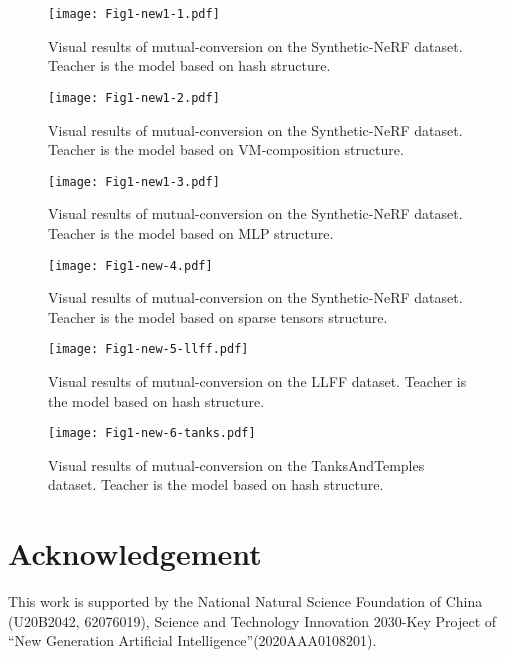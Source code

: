 \documentclass[letterpaper]{article} \usepackage{aaai23}  \usepackage{times}  \usepackage{helvet}  \usepackage{courier}  \usepackage[hyphens]{url}  \usepackage{graphicx} \urlstyle{rm} \def\UrlFont{\rm}  \usepackage{natbib}  \usepackage{caption} \frenchspacing  \setlength{\pdfpagewidth}{8.5in}  \setlength{\pdfpageheight}{11in}  \usepackage{multirow}
\begin{document}
\begin{figure*}[t]
    \centering
    \texttt{[image: Fig1-new1-1.pdf]} \caption{Visual results of mutual-conversion on the Synthetic-NeRF dataset. Teacher is the model based on hash structure.}
    \label{fig-tea-hash-mutual-syn}
\end{figure*}

\begin{figure*}[t]
    \centering
    \texttt{[image: Fig1-new1-2.pdf]} \caption{Visual results of mutual-conversion on the Synthetic-NeRF dataset. Teacher is the model based on VM-composition structure.}
    \label{fig-tea-vm-mutual-syn}
\end{figure*}


\begin{figure*}[t]
    \centering
    \texttt{[image: Fig1-new1-3.pdf]} \caption{Visual results of mutual-conversion on the Synthetic-NeRF dataset. Teacher is the model based on MLP structure.}
    \label{fig-tea-mlp-mutual-syn}
\end{figure*}

\begin{figure*}[t]
    \centering
    \texttt{[image: Fig1-new-4.pdf]} \caption{Visual results of mutual-conversion on the Synthetic-NeRF dataset. Teacher is the model based on sparse tensors structure.}
    \label{fig-tea-tensor-mutual-syn}
\end{figure*}

\begin{figure*}[t]
    \centering
    \texttt{[image: Fig1-new-5-llff.pdf]} \caption{Visual results of mutual-conversion on the LLFF dataset. Teacher is the model based on hash structure.}
    \label{fig-ngp2others-llff}
\end{figure*}

\begin{figure*}[t]
    \centering
    \texttt{[image: Fig1-new-6-tanks.pdf]} \caption{Visual results of mutual-conversion on the TanksAndTemples dataset. Teacher is the model based on hash structure.}
    \label{fig-ngp2others-tanks}
\end{figure*}



\section{Acknowledgement}
This work is supported by the National Natural Science Foundation of China (U20B2042, 62076019), Science and Technology Innovation 2030-Key Project of “New Generation Artificial Intelligence”(2020AAA0108201).









\end{document}
